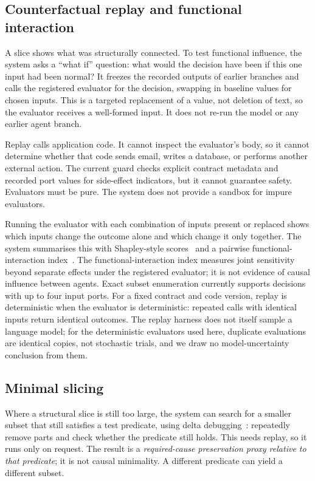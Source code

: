 \documentclass[11pt]{article}
\begin{document}
\subsection{Counterfactual replay and functional interaction}\label{sec:replay}
A slice shows what was structurally connected. To test functional influence, the system asks a ``what if'' question: what would the decision have been if this one input had been normal? It freezes the recorded outputs of earlier branches and calls the registered evaluator for the decision, swapping in baseline values for chosen inputs. This is a targeted replacement of a value, not deletion of text, so the evaluator receives a well-formed input. It does not re-run the model or any earlier agent branch.

Replay calls application code. It cannot inspect the evaluator's body, so it cannot determine whether that code sends email, writes a database, or performs another external action. The current guard checks explicit contract metadata and recorded port values for side-effect indicators, but it cannot guarantee safety. Evaluators must be pure. The system does not provide a sandbox for impure evaluators.

\vspace{1em}   

Running the evaluator with each combination of inputs present or replaced shows which inputs change the outcome alone and which change it only together. The system summarises this with Shapley-style scores~\cite{shapley1953} and a pairwise functional-interaction index~\cite{grabisch1999}. The functional-interaction index measures joint sensitivity beyond separate effects under the registered evaluator; it is not evidence of causal influence between agents. Exact subset enumeration currently supports decisions with up to four input ports. For a fixed contract and code version, replay is deterministic when the evaluator is deterministic: repeated calls with identical inputs return identical outcomes. The replay harness does not itself sample a language model; for the deterministic evaluators used here, duplicate evaluations are identical copies, not stochastic trials, and we draw no model-uncertainty conclusion from them.

\subsection{Minimal slicing}\label{sec:minimal}
Where a structural slice is still too large, the system can search for a smaller subset that still satisfies a test predicate, using delta debugging~\cite{zeller2002}: repeatedly remove parts and check whether the predicate still holds. This needs replay, so it runs only on request. The result is a \emph{required-cause preservation proxy relative to that predicate}; it is not causal minimality. A different predicate can yield a different subset.
\end{document}
